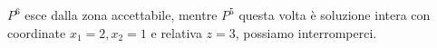 \documentclass{article}
\begin{document}
\begin{center}
\end{center}
$P^6$ esce dalla zona accettabile, mentre $P^5$ questa volta è soluzione intera con coordinate $x_1=2,x_2=1$ e relativa $z=3$, possiamo interromperci.
\end{document}
